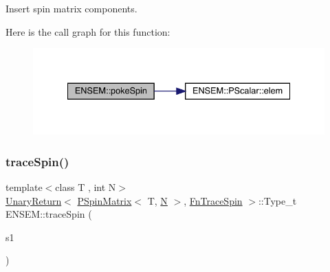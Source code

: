 Insert spin matrix components. 

Here is the call graph for this function\+:\nopagebreak
\begin{figure}[H]
\begin{center}
\leavevmode
\includegraphics[width=334pt]{d6/df5/group__primspinmatrix_ga79a215ef6e9982decb24addd77e93dae_cgraph}
\end{center}
\end{figure}
\mbox{\label{group__primspinmatrix_gaf2ad1f1c91e0de897096d4164e090641}} 
\subsubsection{\texorpdfstring{traceSpin()}{traceSpin()}}
{\footnotesize\ttfamily template$<$class T , int N$>$ \\
\mbox{\hyperlink{structENSEM_1_1UnaryReturn}{Unary\+Return}}$<$ \mbox{\hyperlink{classENSEM_1_1PSpinMatrix}{P\+Spin\+Matrix}}$<$ T, \mbox{\hyperlink{operator__name__util_8cc_a7722c8ecbb62d99aee7ce68b1752f337}{N}} $>$, \mbox{\hyperlink{structENSEM_1_1FnTraceSpin}{Fn\+Trace\+Spin}} $>$\+::Type\+\_\+t E\+N\+S\+E\+M\+::trace\+Spin (\begin{DoxyParamCaption}\item[{const \mbox{\hyperlink{classENSEM_1_1PSpinMatrix}{P\+Spin\+Matrix}}$<$ T, \mbox{\hyperlink{operator__name__util_8cc_a7722c8ecbb62d99aee7ce68b1752f337}{N}} $>$ \&}]{s1 }\end{DoxyParamCaption})\hspace{0.3cm}{\ttfamily [inline]}}

\mbox{\label{group__primspinmatrix_gab5c053ea22b374090822742e46ebd402}} 

